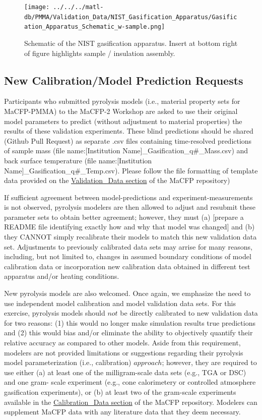 \documentclass[12pt]{article}
\begin{document}
\begin{figure}
     \centering
         \texttt{[image: ../../../matl-db/PMMA/Validation\_Data/NIST\_Gasification\_Apparatus/Gasification\_Apparatus\_Schematic\_w-sample.png]}
         \caption{ Schematic of the NIST gasification apparatus. Insert at bottom right of figure highlights sample / insulation assembly.}
         \label{fig:NISTGasApp}
\end{figure}

\subsection{New Calibration/Model Prediction Requests }
Participants who submitted pyrolysis models (i.e., material property sets for MaCFP-PMMA) to the MaCFP-2 Workshop are asked to use their original model parameters to predict (without adjustment to material properties) the results of these validation experiments. These blind predictions should be shared (Github Pull Request) as separate .csv files containing time-resolved predictions of sample mass (file name:[Institution Name]\_Gasification\_q\#\_Mass.csv) and back surface temperature (file name:[Institution Name]\_Gasification\_q\#\_Temp.csv). Please follow the file formatting of template data provided on the \href{https://github.com/MaCFP/matl-db/tree/master/PMMA/Validation_Data}{Validation\_Data section} of the MaCFP repository)

If sufficient agreement between model-predictions and experiment-measurements is not observed, pyrolysis modelers are then allowed to adjust and resubmit these parameter sets to obtain better agreement; however, they must (a) [prepare a README file identifying exactly how and why that model was changed] and (b) they CANNOT simply recalibrate their models to match this new validation data set.  Adjustments to previously calibrated data sets may arrise for many reasons, including,  but not limited to, changes in assumed boundary conditions of model calibration data or incorporation new calibration data obtained in different test apparatus and/or heating conditions.

New pyrolysis models are also welcomed. Once again, we emphasize the need to use independent model calibration and model validation data sets. For this exercise, pyrolysis models should $not$ be directly calibrated to new validation data for two reasons: (1) this would no longer make simulation results true predictions and (2) this would bias and/or eliminate the ability to objectively quantify their relative accuracy as compared to other models. Aside from this requirement, modelers are not provided limitations or suggestions regarding their pyrolysis model parameterization (i.e., calibration) $approach$; however, they are required to use either (a) at least one of the milligram-scale data sets (e.g., TGA or DSC) and one gram- scale experiment (e.g., cone calorimetery or controlled atmosphere gasification experiments), or (b) at least two of the gram-scale experiments available in the \href{https://github.com/MaCFP/matl-db/tree/master/PMMA/Calibration_Data}{Calibration\_Data section} of the MaCFP repository. Modelers can supplement MaCFP data with any literature data that they deem necessary. 
\end{document}
